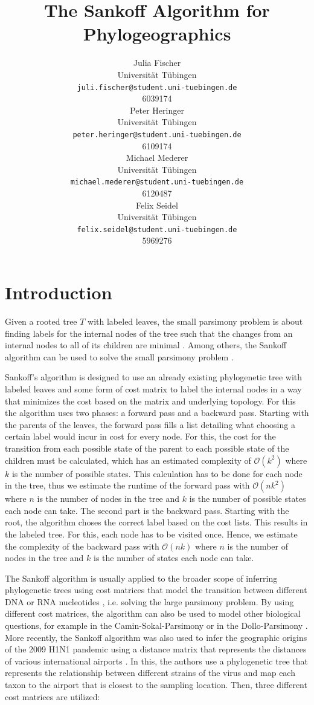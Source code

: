 \documentclass{article}
\title{The Sankoff Algorithm for Phylogeographics}
\author{
  Julia Fischer \\
  Universität Tübingen \\
  \texttt{juli.fischer@student.uni-tuebingen.de} \\
  6039174 \\
  \And
  Peter Heringer \\
  Universität Tübingen \\
  \texttt{peter.heringer@student.uni-tuebingen.de} \\
  6109174 \\
  \And 
  Michael Mederer \\
  Universität Tübingen \\
  \texttt{michael.mederer@student.uni-tuebingen.de} \\
  6120487 \\
  \And 
  Felix Seidel \\
  Universität Tübingen \\
  \texttt{felix.seidel@student.uni-tuebingen.de} \\
  5969276 \\
}
\begin{document}
\maketitle

\begin{abstract}
\end{abstract}


\section{Introduction}
Given a rooted tree $T$ with labeled leaves, the small parsimony problem is about
finding labels for the internal nodes of the tree such that the changes from an
internal nodes to all of its children are minimal
\cite{jonesIntroductionBioinformaticsAlgorithms2004}.
Among others, the Sankoff algorithm can be used to solve the small parsimony
problem \cite{sankoffMinimalMutationTrees1975}. 

Sankoff's algorithm is designed to use an already existing phylogenetic tree with labeled leaves and
some form of cost matrix to label the internal nodes in a way that minimizes the cost based on the
matrix and underlying topology. For this the algorithm uses two phases: a
forward pass and a backward pass.
Starting with the parents of the leaves, the forward pass fills a
list detailing what choosing a certain label would incur in
cost for every node. For this, the cost for the transition from each possible state of the
parent to each possible state of the children must be calculated, which has an
estimated complexity of $\mathcal{O}(k^2)$ where $k$ is the number of possible
states. This calculation has to be done for each node in the tree, thus we
estimate the runtime of the forward pass
with $\mathcal{O}(nk^2)$ where $n$ is the number of nodes in the tree and $k$ is
the number of possible states each node can take.
The second part is the backward pass. Starting with the root, the algorithm
choses the correct label based on the cost lists. This results in the labeled
tree. For this, each node has to be visited once. Hence, we estimate the
complexity of the backward pass with $\mathcal{O}(nk)$ where $n$ is the number of
nodes in the tree and $k$ is the number of states each node can take.

The Sankoff algorithm is usually applied to the broader scope of
inferring phylogenetic trees using cost matrices that model the transition
between different DNA or RNA nucleotides
\cite{jonesIntroductionBioinformaticsAlgorithms2004}, i.e. solving the large parsimony problem. By
using different cost
matrices, the algorithm can also be used to model other biological questions,
for example in the Camin-Sokal-Parsimony \cite{caminMethodDeducingBranching1965}
or in the Dollo-Parsimony \cite{farrisPhylogeneticAnalysisDollo2022}. More
recently, the Sankoff algorithm was also used to infer the geographic origins of
the 2009 H1N1 pandemic using a distance matrix that represents the distances of
various international airports
\cite{reimeringPhylogeographicReconstructionUsing2020}. In this, the authors use
a phylogenetic tree that represents the relationship between different strains
of the virus and map each taxon to the airport that is closest to the sampling
location. Then, three different cost matrices are utilized:
\end{document}

